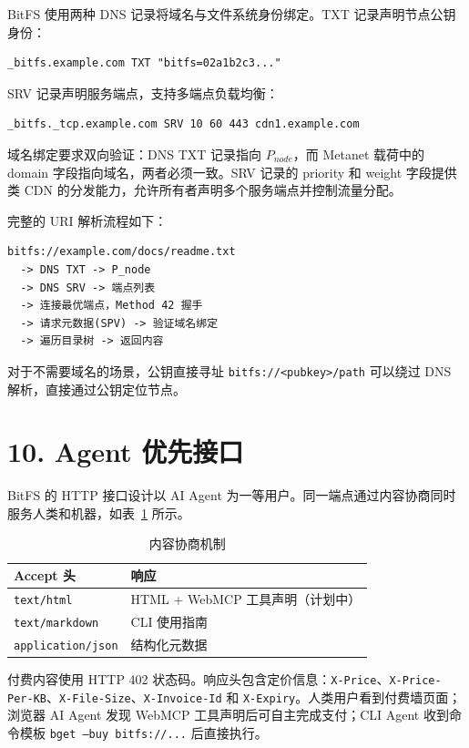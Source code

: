 \documentclass[11pt,a4paper]{article}
\begin{document}
BitFS 使用两种 DNS 记录将域名与文件系统身份绑定。TXT 记录声明节点公钥身份：

\begin{lstlisting}
_bitfs.example.com TXT "bitfs=02a1b2c3..."
\end{lstlisting}

SRV 记录声明服务端点，支持多端点负载均衡：

\begin{lstlisting}
_bitfs._tcp.example.com SRV 10 60 443 cdn1.example.com
\end{lstlisting}

域名绑定要求双向验证：DNS TXT 记录指向 $P_{node}$，而 Metanet 载荷中的 domain 字段指向域名，两者必须一致。SRV 记录的 priority 和 weight 字段提供类 CDN 的分发能力，允许所有者声明多个服务端点并控制流量分配。

完整的 URI 解析流程如下：

\begin{lstlisting}
bitfs://example.com/docs/readme.txt
  -> DNS TXT -> P_node
  -> DNS SRV -> 端点列表
  -> 连接最优端点，Method 42 握手
  -> 请求元数据(SPV) -> 验证域名绑定
  -> 遍历目录树 -> 返回内容
\end{lstlisting}

对于不需要域名的场景，公钥直接寻址 \texttt{bitfs://<pubkey>/path} 可以绕过 DNS 解析，直接通过公钥定位节点。

\section{10. Agent 优先接口}

BitFS 的 HTTP 接口设计以 AI Agent 为一等用户。同一端点通过内容协商同时服务人类和机器，如表~\ref{tab:content-negotiation} 所示。

\begin{table}[htbp]
\centering
\begin{tabular}{ll}
\toprule
\textbf{Accept 头} & \textbf{响应} \\
\midrule
\texttt{text/html} & HTML + WebMCP 工具声明（计划中） \\
\texttt{text/markdown} & CLI 使用指南 \\
\texttt{application/json} & 结构化元数据 \\
\bottomrule
\end{tabular}
\caption{内容协商机制}
\label{tab:content-negotiation}
\end{table}

付费内容使用 HTTP 402 状态码。响应头包含定价信息：\texttt{X-Price}、\texttt{X-Price-Per-KB}、\texttt{X-File-Size}、\texttt{X-Invoice-Id} 和 \texttt{X-Expiry}。人类用户看到付费墙页面；浏览器 AI Agent 发现 WebMCP 工具声明后可自主完成支付；CLI Agent 收到命令模板 \texttt{bget --buy bitfs://...} 后直接执行。
\end{document}
